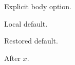\documentclass{article}
\begin{document}
\begin{panelbox}[backgroundcolor=red]Explicit body option.\end{panelbox}
{\begin{mdframed}Local default.\end{mdframed}}
\begin{mdframed}[hidealllines=true,fontcolor=red]Restored default.\end{mdframed}
After $x$.
\end{document}

